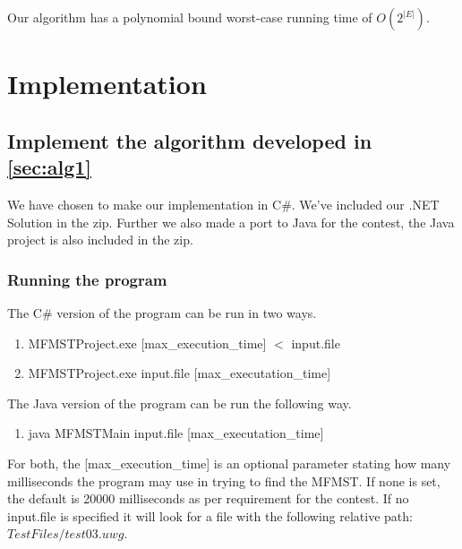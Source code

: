\documentclass[12pt]{report}
\begin{document}
Our algorithm has a polynomial bound worst-case running time of $O(2^{|E|})$.

\chapter{Implementation}
\section{Implement the algorithm developed in \ref{sec:alg1}}
We have chosen to make our implementation in C\#. We've included our .NET Solution in the zip. Further we also made a port to Java for the contest, the Java project is also included in the zip.
 
\subsection{Running the program}
The C\# version of the program can be run in two ways.
\begin{enumerate}
	\item MFMSTProject.exe [max\_execution\_time] $<$ input.file
	\item MFMSTProject.exe input.file [max\_executation\_time]
\end{enumerate}

The Java version of the program can be run the following way.
\begin{enumerate}
	\item java MFMSTMain input.file [max\_executation\_time]
\end{enumerate}

For both, the [max\_execution\_time] is an optional parameter stating how many milliseconds the program may use in trying to find the MFMST. If none is set, the default is 20000 milliseconds as per requirement for the contest. If no input.file is specified it will look for a file with the following relative path: $TestFiles/test03.uwg$.
\newpage
\end{document}
